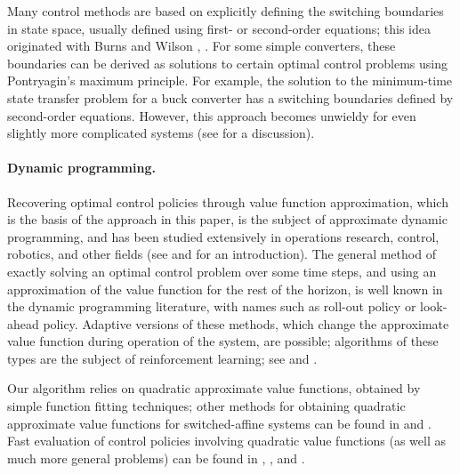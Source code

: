 \documentclass[12pt]{article}
\begin{document}
Many control methods are based on explicitly defining the switching boundaries
in state space,
usually defined using first- or second-order equations;
this idea originated with Burns and Wilson
\cite{burns1976state}, 
\cite{burns1977analytic}.
For some simple converters,
these boundaries can be derived as 
solutions to certain optimal control problems 
using Pontryagin's maximum principle.
For example, the solution to the minimum-time state transfer problem
for a buck converter has a switching boundaries defined by second-order equations.
However, this approach becomes unwieldy for even slightly more complicated systems
(see \cite{dhople2014time} for a discussion).





\paragraph{Dynamic programming.}
Recovering optimal control policies through value function approximation,
which is the basis of the approach in this paper,
is the subject of approximate dynamic programming,
and has been studied extensively in 
operations research, control, robotics, and other fields
(see \cite{bertsekas1995dynamic} and \cite{powell2007approximate} for an introduction).
The general method of exactly solving an optimal control problem
over some time steps, and using an approximation of the value function
for the rest of the horizon, is well known in the dynamic programming
literature, with names such as roll-out policy or look-ahead policy.
Adaptive versions of these methods,
which change the approximate value function during operation of the system,
are possible;
algorithms of these types are the subject of reinforcement learning;
see \cite{sutton1998introduction} and \cite{bertsekas1995dynamic}.

Our algorithm relies on quadratic approximate value functions,
obtained by simple function fitting techniques;
other methods for obtaining quadratic approximate value functions for switched-affine
systems can be found in 
\cite{rantzer2006relaxed} and \cite{wang2015approximate}.
Fast evaluation of control policies involving quadratic value functions
(as well as much more general problems)
can be found in 
\cite{yang2011lyapunov}, \cite{mattingley2011receding}, and
\cite{yang2010fast}.
\end{document}
